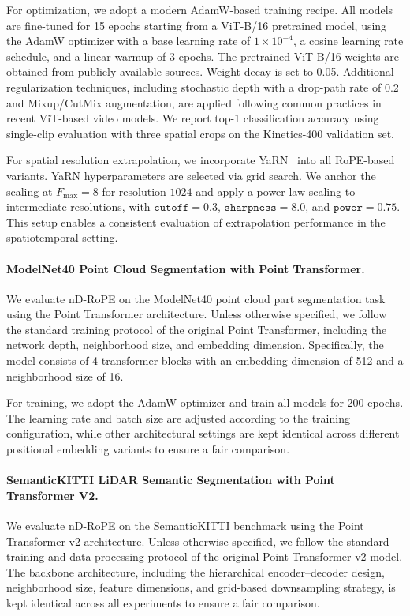 \documentclass{article}
\theoremstyle{plain}
\theoremstyle{definition}
\theoremstyle{remark}
\begin{document}
For optimization, we adopt a modern AdamW-based training recipe. All models are fine-tuned for 15 epochs starting from a ViT-B/16 pretrained model, using the AdamW optimizer with a base learning rate of $1\times10^{-4}$, a cosine learning rate schedule, and a linear warmup of 3 epochs. The pretrained ViT-B/16 weights are obtained from publicly available sources. Weight decay is set to 0.05. Additional regularization techniques, including stochastic depth with a drop-path rate of 0.2 and Mixup/CutMix augmentation, are applied following common practices in recent ViT-based video models. We report top-1 classification accuracy using single-clip evaluation with three spatial crops on the Kinetics-400 validation set.

For spatial resolution extrapolation, we incorporate YaRN~\cite{peng2023yarn} into all RoPE-based variants. YaRN hyperparameters are selected via grid search. We anchor the scaling at $F_{\max}=8$ for resolution $1024$ and apply a power-law scaling to intermediate resolutions, with $\texttt{cutoff}=0.3$, $\texttt{sharpness}=8.0$, and $\texttt{power}=0.75$. This setup enables a consistent evaluation of extrapolation performance in the spatiotemporal setting.

\paragraph{ModelNet40 Point Cloud Segmentation with Point Transformer.}
We evaluate nD-RoPE on the ModelNet40 point cloud part segmentation task using the Point Transformer architecture. Unless otherwise specified, we follow the standard training protocol of the original Point Transformer, including the network depth, neighborhood size, and embedding dimension. Specifically, the model consists of 4 transformer blocks with an embedding dimension of 512 and a neighborhood size of 16.

For training, we adopt the AdamW optimizer and train all models for 200 epochs. The learning rate and batch size are adjusted according to the training configuration, while other architectural settings are kept identical across different positional embedding variants to ensure a fair comparison.

\paragraph{SemanticKITTI LiDAR Semantic Segmentation with Point Transformer V2.}

We evaluate nD-RoPE on the SemanticKITTI benchmark using the Point Transformer v2 architecture. Unless otherwise specified, we follow the standard training and data processing protocol of the original Point Transformer v2 model. The backbone architecture, including the hierarchical encoder–decoder design, neighborhood size, feature dimensions, and grid-based downsampling strategy, is kept identical across all experiments to ensure a fair comparison.
\end{document}
